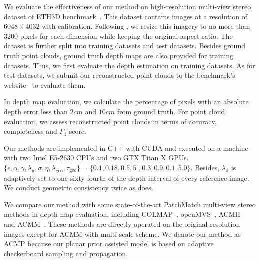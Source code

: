 \documentclass[letterpaper]{article} %
\begin{document}
 We evaluate the effectiveness of our method on high-resolution multi-view stereo dataset of ETH3D benchmark~\cite{Schops2017Multi}. This dataset contains images at a resolution of $6048\times4032$ with calibration. Following \cite{Schonberger2016Pixelwise,Xu2018Multi}, we resize this imagery to no more than $3200$ pixels for each dimension while keeping the original aspect ratio. The dataset is further split into training datasets and test datasets. Besides ground truth point clouds, ground truth depth maps are also provided for training datasets. Thus, we first evaluate the depth estimation on training datasets. As for test datasets, we submit our reconstructed point clouds to the benchmark's website~\cite{Schops2017ETH3D} to evaluate them.

 In depth map evaluation, we calculate the percentage of pixels with an absolute depth error less than $2cm$ and $10cm$ from ground truth. For point cloud evaluation, we assess reconstructed point clouds in terms of accuracy, completeness and $F_{1}$ score. 

 Our methods are implemented in C++ with CUDA and executed on a machine with two Intel E5-2630 CPUs and two GTX Titan X GPUs. $\{\epsilon,\alpha,\gamma, \lambda_\text{n}, \sigma,\eta,\lambda_\text{geo},\tau_\text{geo}\}=\{0.1,0.18,0.5,5^\circ,0.3,0.9,0.1,5.0\}$. Besides, $\lambda_\text{d}$ is adaptively set to one sixty-fourth of the depth interval of every reference image. We conduct geometric consistency twice as \cite{Xu2018Multi} does.

 We compare our method with some state-of-the-art PatchMatch multi-view stereo methods in depth map evaluation, including COLMAP~\cite{Schonberger2016Pixelwise}, openMVS~\cite{openMVS}, ACMH~\cite{Xu2018Multi} and ACMM~\cite{Xu2018Multi}. These methods are directly operated on the original resolution images except for ACMM with multi-scale scheme. We denote our method as ACMP because our planar prior assisted model is based on adaptive checkerboard sampling and propagation.
\end{document}
